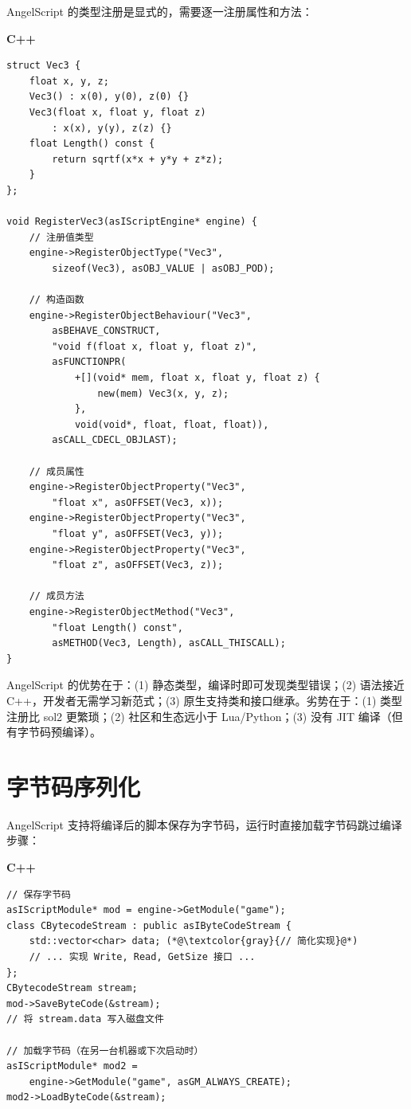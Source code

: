 \documentclass[12pt,a4paper,fontset=fandol]{ctexbook}
\newenvironment{compare}[1][]{%
  \begin{tcolorbox}[enhanced,breakable,
    colback=green!3!white,colframe=green!50!black,
    boxed title style={colback=green!50!black},
    attach boxed title to top left={yshift=-2mm,xshift=2mm},
    arc=2mm,boxrule=0.8mm,
    title={方案对比},#1]}%
  {\end{tcolorbox}}
\newcommand{\cpplabel}{%
  \noindent\begin{tcolorbox}[colback=algheadbg,coltext=white,
    sharp corners,boxrule=0pt,width=3.0em,height=1.4em,
    halign=center,valign=center,nobeforeafter,left=0pt,right=0pt,
    top=0pt,bottom=0pt]\small\bfseries C++\end{tcolorbox}}
\begin{document}
AngelScript 的类型注册是显式的，需要逐一注册属性和方法：

\cpplabel
\begin{lstlisting}[style=cppstyle]
struct Vec3 {
    float x, y, z;
    Vec3() : x(0), y(0), z(0) {}
    Vec3(float x, float y, float z)
        : x(x), y(y), z(z) {}
    float Length() const {
        return sqrtf(x*x + y*y + z*z);
    }
};

void RegisterVec3(asIScriptEngine* engine) {
    // 注册值类型
    engine->RegisterObjectType("Vec3",
        sizeof(Vec3), asOBJ_VALUE | asOBJ_POD);

    // 构造函数
    engine->RegisterObjectBehaviour("Vec3",
        asBEHAVE_CONSTRUCT,
        "void f(float x, float y, float z)",
        asFUNCTIONPR(
            +[](void* mem, float x, float y, float z) {
                new(mem) Vec3(x, y, z);
            },
            void(void*, float, float, float)),
        asCALL_CDECL_OBJLAST);

    // 成员属性
    engine->RegisterObjectProperty("Vec3",
        "float x", asOFFSET(Vec3, x));
    engine->RegisterObjectProperty("Vec3",
        "float y", asOFFSET(Vec3, y));
    engine->RegisterObjectProperty("Vec3",
        "float z", asOFFSET(Vec3, z));

    // 成员方法
    engine->RegisterObjectMethod("Vec3",
        "float Length() const",
        asMETHOD(Vec3, Length), asCALL_THISCALL);
}
\end{lstlisting}

\begin{compare}[title={AngelScript vs Lua}]
AngelScript 的优势在于：(1) 静态类型，编译时即可发现类型错误；(2) 语法接近 C++，开发者无需学习新范式；(3) 原生支持类和接口继承。劣势在于：(1) 类型注册比 sol2 更繁琐；(2) 社区和生态远小于 Lua/Python；(3) 没有 JIT 编译（但有字节码预编译）。
\end{compare}

\section{字节码序列化}\label{sec:as-bytecode}

AngelScript 支持将编译后的脚本保存为字节码，运行时直接加载字节码跳过编译步骤：

\cpplabel
\begin{lstlisting}[style=cppstyle]
// 保存字节码
asIScriptModule* mod = engine->GetModule("game");
class CBytecodeStream : public asIByteCodeStream {
    std::vector<char> data; (*@\textcolor{gray}{// 简化实现}@*)
    // ... 实现 Write, Read, GetSize 接口 ...
};
CBytecodeStream stream;
mod->SaveByteCode(&stream);
// 将 stream.data 写入磁盘文件

// 加载字节码（在另一台机器或下次启动时）
asIScriptModule* mod2 =
    engine->GetModule("game", asGM_ALWAYS_CREATE);
mod2->LoadByteCode(&stream);
\end{lstlisting}
\end{document}
